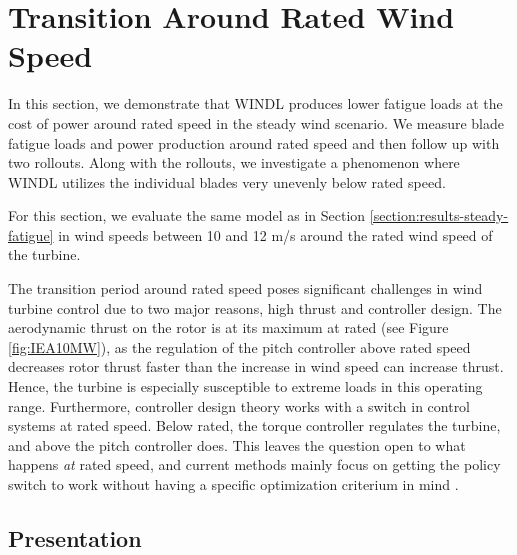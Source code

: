 \section{Transition Around Rated Wind Speed}
\label{section:results-transition}

\begin{summary}
In this section, we demonstrate that WINDL produces lower fatigue loads at the cost of power around rated speed in the steady wind scenario. We measure blade fatigue loads and power production around rated speed and then follow up with two rollouts. Along with the rollouts, we investigate a phenomenon where WINDL utilizes the individual blades very unevenly below rated speed.
\end{summary}

For this section, we evaluate the same model as in Section \ref{section:results-steady-fatigue} in wind speeds between 10 and 12 m/s around the rated wind speed of the turbine.

The transition period around rated speed poses significant challenges in wind turbine control due to two major reasons, high thrust and controller design. The aerodynamic thrust on the rotor is at its maximum at rated (see Figure \ref{fig:IEA10MW}), as the regulation of the pitch controller above rated speed decreases rotor thrust faster than the increase in wind speed can increase thrust. Hence, the turbine is especially susceptible to extreme loads in this operating range. Furthermore, controller design theory works with a switch in control systems at rated speed. Below rated, the torque controller regulates the turbine, and above the pitch controller does. This leaves the question open to what happens \textit{at} rated speed, and current methods mainly focus on getting the policy switch to work without having a specific optimization criterium in mind \cite[Section 8.3.4]{burtonWindEnergyHandbook2011}. 

\subsection{Presentation}

